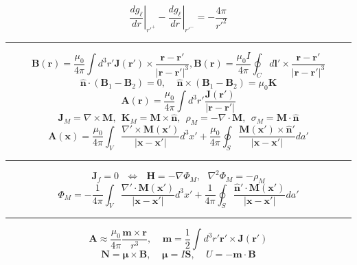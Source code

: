 \documentclass[twocolumn]{article}
\newcommand{\0}{\textcolor{gray}{0}}
\newcommand{\gr}{\nabla}
\newcommand{\di}{\nabla\cdot}
\newcommand{\ro}{\nabla\times}
\newcommand{\la}{\nabla^2}
\newcommand{\rv}{\mathbf{r}}
\newcommand{\xv}{\mathbf{x}}
\newcommand{\nhat}{\hat{\mathbf{n}}}
\newcommand{\uo}{\mu_{0}}
\newcommand{\rdif}{\rv - \rv'}
\newcommand{\td}[2]{\dfrac{d #1}{d #2}}
\newcommand{\n}[1]{\mathbf{#1}}
\begin{document}
\begin{equation*}
	\left.\td{g_\ell}{r}\right|_{r'^+} - \left.\td{g_\ell}{r}\right|_{r'^-} = 	- \frac{4\pi}{r'^2}
\end{equation*}
\vspace{-2mm}\hrule\vspace{1mm}
\begin{equation*}
	\n{B}(\rv) = \frac{\uo}{4 \pi} \int d^3 r' \n{J}(\rv') \times \frac{\rdif}{|\rdif|^3}, \n{B}(\rv) = \frac{\uo I}{4 \pi} \oint_{C} d\n{l}' \times \frac{\rdif}{|\rdif|^3}
\end{equation*}
\begin{equation*}
	\nhat \cdot  (\n{B}_{1} - \n{B}_{2}) = 0, ~~~~~ \nhat \times (\n{B}_{1} - \n{B}_{2}) = \uo \n{K}
\end{equation*}
\begin{equation*}
	\n{A}(\rv) = \frac{\uo}{4 \pi} \int d^3 r' \frac{\n{J}(\rv')}{|\rv - \rv'|}\label{A}
\end{equation*}
\begin{equation*}
	\n{J}_{M} = \ro\n{M}, ~~ \n{K}_{M} = \n{M}\times\nhat, ~~ \rho_{M} = -\di\n{M}, ~~ \sigma_{M} = \n{M}\cdot\nhat
\end{equation*}
\begin{equation*}
	\n{A}(\xv) = \frac{\uo}{4 \pi} \int_{V} \frac{\nabla'\times\n{M}(\xv')}{|\xv - \xv'|} d^3 x' + \frac{\uo}{4 \pi} \oint_{S} \frac{\n{M}(\xv')\times\nhat'}{|\xv - \xv'|} da'
\end{equation*}
\vspace{-2mm}\hrule\vspace{1mm}
\begin{equation*}
	\n{J}_{f} = 0 ~~~ \Leftrightarrow ~~~ \n{H} = -\gr\Phi_{M}, ~~~ \la\Phi_{M} = -\rho_{M}
\end{equation*}
\begin{equation*}
	\Phi_{M} = - \frac{1}{4\pi} \int_{V} \frac{\nabla' \cdot \n{M}(\xv')}{|\xv - \xv'|}d^3 x' + \frac{1}{4\pi}\oint_{S}\frac{\nhat' \cdot \n{M}(\xv')}{|\xv - \xv'|} da' \label{PhiM_sol}
\end{equation*}
\vspace{-2mm}\hrule\vspace{1mm}
\begin{equation*}
	\n{A} \approx \frac{\uo}{4\pi} \frac{\n{m}\times\rv}{r^3}, ~~~~~ \n{m} = \frac{1}{2} \int d^3 r' \rv' \times \n{J}(\rv')
\end{equation*}
\begin{equation*}
	\n{N} = \n{\mu} \times \n{B}, ~~~~~ \n{\mu} = I\n{S}, ~~~~~ U = - \n{m}\cdot\n{B}
\end{equation*}
\end{document}
